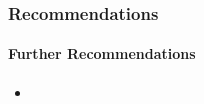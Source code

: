 \begin{frame}
  \frametitle{Recommendations}
  \framesubtitle{Further Recommendations}
  \begin{itemize}
    \item<1->

           {\scriptsize{}}

  \end{itemize}
\end{frame}
